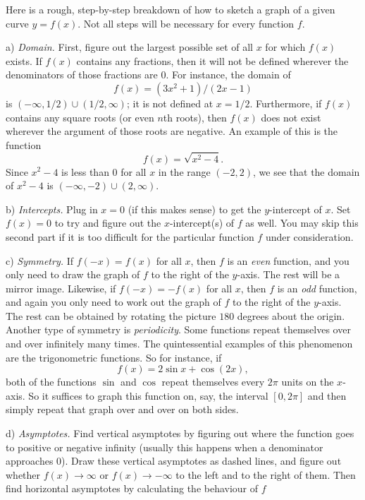 Here is a rough, step-by-step breakdown of how to sketch a graph of a given curve $y=f(x)$. Not all steps
will be necessary for every function $f$.

\medskip
\item{a)} {\it Domain.} First, figure out the largest possible set of all $x$ for which $f(x)$ exists.
If $f(x)$ contains any fractions, then it will not be defined wherever the denominators of those fractions
are $0$. For instance, the domain of
$$f(x) = (3x^2 +1)/(2x-1)$$
is $(-\infty, 1/2) \cup (1/2,\infty)$;
it is not defined at $x=1/2$.
Furthermore, if $f(x)$ contains any square roots (or even $n$th roots), then $f(x)$ does not exist
wherever the argument of those roots are negative. An example of this is the function
$$f(x) = \sqrt{x^2 - 4}.$$
Since $x^2 - 4$ is less than $0$ for all $x$ in the range $(-2,2)$, we see that the domain of $x^2 - 4$
is $(-\infty, -2)\cup (2,\infty)$.
\smallskip
\item{b)} {\it Intercepts.} Plug in $x=0$ (if this makes sense) to get the $y$-intercept of $x$.
Set $f(x) = 0$ to try and figure out the $x$-intercept(s) of $f$ as well. You may skip this second part if
it is too difficult for the particular function $f$ under consideration.
\smallskip
\item{c)} {\it Symmetry.} If $f(-x) = f(x)$ for all $x$, then $f$ is an {\it even} function, and you only
need to draw the graph of $f$ to the right of the $y$-axis. The rest will be a mirror image. Likewise,
if $f(-x) = -f(x)$ for all $x$, then $f$ is an {\it odd} function, and again you only need to work out the graph
of $f$ to the right of the $y$-axis. The rest can be obtained by rotating the picture $180$ degrees about
the origin. Another type of symmetry is {\it periodicity}.
Some functions repeat themselves over and over infinitely many times. The
quintessential examples of this phenomenon are the trigonometric functions. So for instance, if
$$f(x) = 2\sin x + \cos(2x),$$
both of the functions $\sin$ and $\cos$ repeat themselves every $2\pi$ units on the $x$-axis. So
it suffices to graph this function on, say, the interval $[0,2\pi]$ and then simply repeat that graph
over and over on both sides.
\smallskip
\item{d)} {\it Asymptotes.} Find vertical asymptotes by figuring out where the function goes to
positive or negative infinity (usually this happens when a denominator approaches $0$). Draw these
vertical asymptotes as dashed lines, and figure out whether $f(x)\to\infty$ or $f(x)\to-\infty$ to the
left and to the right of them. Then find horizontal asymptotes by calculating the behaviour of $f$
